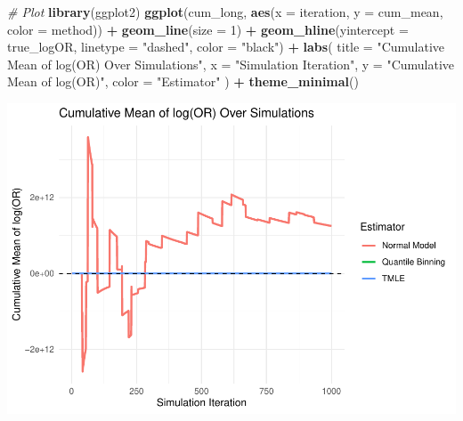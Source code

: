 \documentclass[
]{article}
\newenvironment{Shaded}{\begin{snugshade}}{\end{snugshade}}
\newcommand{\AttributeTok}[1]{\textcolor[rgb]{0.13,0.29,0.53}{#1}}
\newcommand{\CommentTok}[1]{\textcolor[rgb]{0.56,0.35,0.01}{\textit{#1}}}
\newcommand{\DecValTok}[1]{\textcolor[rgb]{0.00,0.00,0.81}{#1}}
\newcommand{\FunctionTok}[1]{\textcolor[rgb]{0.13,0.29,0.53}{\textbf{#1}}}
\newcommand{\NormalTok}[1]{#1}
\newcommand{\SpecialCharTok}[1]{\textcolor[rgb]{0.81,0.36,0.00}{\textbf{#1}}}
\newcommand{\StringTok}[1]{\textcolor[rgb]{0.31,0.60,0.02}{#1}}
\begin{document}
\begin{Shaded}
\begin{Highlighting}[]
\CommentTok{\# Plot}
\FunctionTok{library}\NormalTok{(ggplot2)}
\FunctionTok{ggplot}\NormalTok{(cum\_long, }\FunctionTok{aes}\NormalTok{(}\AttributeTok{x =}\NormalTok{ iteration, }\AttributeTok{y =}\NormalTok{ cum\_mean, }\AttributeTok{color =}\NormalTok{ method)) }\SpecialCharTok{+}
  \FunctionTok{geom\_line}\NormalTok{(}\AttributeTok{size =} \DecValTok{1}\NormalTok{) }\SpecialCharTok{+}
  \FunctionTok{geom\_hline}\NormalTok{(}\AttributeTok{yintercept =}\NormalTok{ true\_logOR, }\AttributeTok{linetype =} \StringTok{"dashed"}\NormalTok{, }\AttributeTok{color =} \StringTok{"black"}\NormalTok{) }\SpecialCharTok{+}
  \FunctionTok{labs}\NormalTok{(}
    \AttributeTok{title =} \StringTok{"Cumulative Mean of log(OR) Over Simulations"}\NormalTok{,}
    \AttributeTok{x =} \StringTok{"Simulation Iteration"}\NormalTok{,}
    \AttributeTok{y =} \StringTok{"Cumulative Mean of log(OR)"}\NormalTok{,}
    \AttributeTok{color =} \StringTok{"Estimator"}
\NormalTok{  ) }\SpecialCharTok{+}
  \FunctionTok{theme\_minimal}\NormalTok{()}
\end{Highlighting}
\end{Shaded}

\includegraphics{simulation_files/figure-latex/sim-plot-1.pdf}
\end{document}

